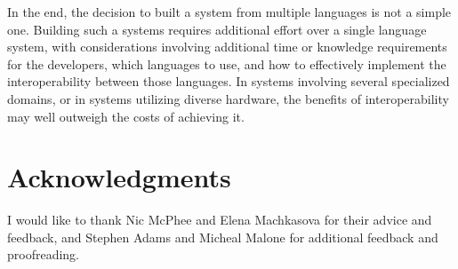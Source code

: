 \documentclass{sig-alternate}
\begin{document}
In the end, the decision to built a system from multiple languages is not a simple one. Building such a systems requires additional effort over a single language system, with considerations involving additional time or knowledge requirements for the developers, which languages to use, and how to effectively implement the interoperability between those languages. In systems involving several specialized domains, or in systems utilizing diverse hardware, the benefits of interoperability may well outweigh the costs of achieving it.




\section{Acknowledgments}
I would like to thank Nic McPhee and Elena Machkasova for their advice and feedback, and Stephen Adams and Micheal Malone for additional feedback and proofreading.



  
\end{document}
